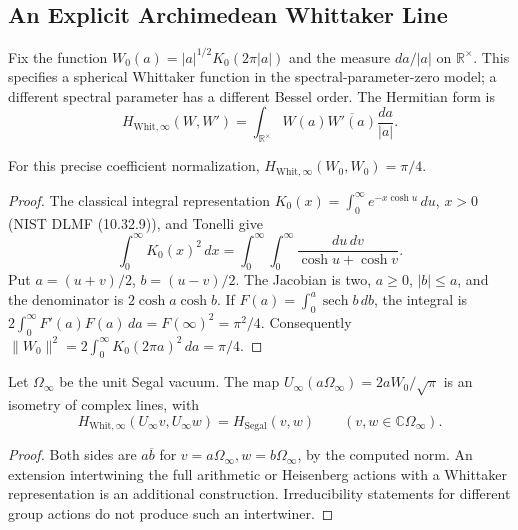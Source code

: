 \subsection{An Explicit Archimedean Whittaker Line}
\label{v4-arith:kp:arch:Pet-infty}
Fix the function \(W_0(a)=|a|^{1/2}K_0(2\pi|a|)\) and the measure
\(da/|a|\) on \(\mathbb R^\times\). This specifies a spherical
Whittaker function in the spectral-parameter-zero model; a different
spectral parameter has a different Bessel order. The Hermitian form is
\begin{equation}
\label{v4-arith:kp:eq:Pet-arch-Whittaker}
 H_{\mathrm{Whit},\infty}(W,W')=
 \int_{\mathbb R^\times}W(a)\overline{W'(a)}\frac{da}{|a|}.
\end{equation}
\begin{lemma}
\label{v4-arith:kp:lem:Whittaker-is-Fock}
For this precise coefficient normalization,
\(H_{\mathrm{Whit},\infty}(W_0,W_0)=\pi/4\).
\end{lemma}
\begin{proof}
The classical integral representation
\(K_0(x)=\int_0^\infty e^{-x\cosh u}\,du\), \(x>0\)
(NIST DLMF (10.32.9)), and Tonelli give
\[
 \int_0^\infty K_0(x)^2\,dx
 =\int_0^\infty\!\int_0^\infty
       \frac{du\,dv}{\cosh u+\cosh v}.
\]
Put \(a=(u+v)/2\), \(b=(u-v)/2\). The Jacobian is two,
\(a\ge0\), \(|b|\le a\), and the denominator is
\(2\cosh a\cosh b\). If \(F(a)=\int_0^a\operatorname{sech}b\,db\),
the integral is \(2\int_0^\infty F'(a)F(a)\,da=F(\infty)^2=\pi^2/4\).
Consequently
\(\|W_0\|^2=2\int_0^\infty K_0(2\pi a)^2\,da=\pi/4\).
\end{proof}
\begin{proposition}
\label{v4-arith:kp:prop:Pet-is-Segal-infty}
Let \(\Omega_\infty\) be the unit Segal vacuum. The map
\(U_\infty(a\Omega_\infty)=2aW_0/\sqrt\pi\) is an isometry of
complex lines, with
\begin{equation}
\label{v4-arith:kp:eq:Pet-infty}
 H_{\mathrm{Whit},\infty}(U_\infty v,U_\infty w)
 =H_{\mathrm{Segal}}(v,w)
 \qquad(v,w\in\mathbb C\Omega_\infty).
\end{equation}
\end{proposition}
\begin{proof}
Both sides are \(a\overline b\) for
\(v=a\Omega_\infty,w=b\Omega_\infty\), by the computed norm.
An extension intertwining the full arithmetic or Heisenberg actions
with a Whittaker representation is an additional construction.
Irreducibility statements for different group actions do not produce
such an intertwiner.
\end{proof}

